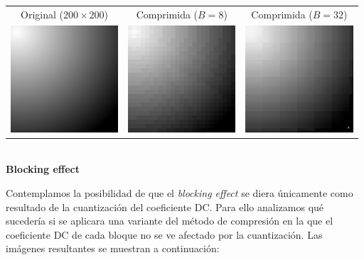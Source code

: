 \documentclass{article}
\begin{document}
\begin{center}
\begin{tabular}{|c|c|c|}
\hline
Original ($200 \times 200$)
&
Comprimida ($B = 8$)
&
Comprimida ($B = 32$)
\\
\includegraphics[width=4cm]{../imgs/output/blocking_effect/blocking.png}
&
\includegraphics[width=4cm]{../imgs/output/blocking_effect/blocking_b8.png}
&
\includegraphics[width=4cm]{../imgs/output/blocking_effect/blocking_b32.png} \\
\hline
\end{tabular}\\
{\bf Blocking effect}
\end{center}

Contemplamos la posibilidad de que el {\em blocking effect} se diera
únicamente como resultado de la cuantización del coeficiente DC.
Para ello analizamos qué sucedería si se aplicara una variante del
método de compresión en la que el coeficiente DC de cada bloque
no se ve afectado por la cuantización. Las imágenes resultantes se
muestran a continuación:
\end{document}
